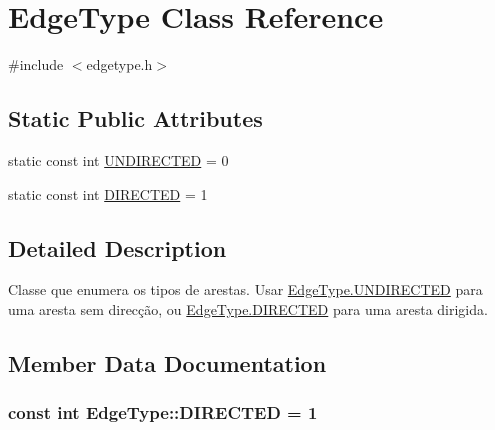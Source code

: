\hypertarget{class_edge_type}{}\section{Edge\+Type Class Reference}
\label{class_edge_type}


{\ttfamily \#include $<$edgetype.\+h$>$}

\subsection*{Static Public Attributes}
\begin{DoxyCompactItemize}
\item 
static const int \hyperlink{class_edge_type_a6533cc56d05c288a550b9980b66c9317}{U\+N\+D\+I\+R\+E\+C\+T\+E\+D} = 0
\item 
static const int \hyperlink{class_edge_type_a903017a534f2818c2d17145e4ae0321c}{D\+I\+R\+E\+C\+T\+E\+D} = 1
\end{DoxyCompactItemize}


\subsection{Detailed Description}
Classe que enumera os tipos de arestas. Usar \hyperlink{class_edge_type_a6533cc56d05c288a550b9980b66c9317}{Edge\+Type.\+U\+N\+D\+I\+R\+E\+C\+T\+E\+D} para uma aresta sem direcção, ou \hyperlink{class_edge_type_a903017a534f2818c2d17145e4ae0321c}{Edge\+Type.\+D\+I\+R\+E\+C\+T\+E\+D} para uma aresta dirigida. 

\subsection{Member Data Documentation}
\hypertarget{class_edge_type_a903017a534f2818c2d17145e4ae0321c}{}
\subsubsection[{D\+I\+R\+E\+C\+T\+E\+D}]{\setlength{\rightskip}{0pt plus 5cm}const int Edge\+Type\+::\+D\+I\+R\+E\+C\+T\+E\+D = 1\hspace{0.3cm}{\ttfamily [static]}}\label{class_edge_type_a903017a534f2818c2d17145e4ae0321c}
\hypertarget{class_edge_type_a6533cc56d05c288a550b9980b66c9317}{}
